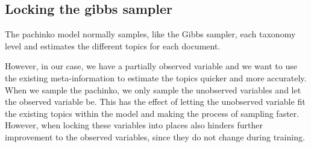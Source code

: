 \subsection{Locking the gibbs sampler}\label{sec:appendix/locking}
The pachinko model normally samples, like the Gibbs sampler, each taxonomy level and estimates the different topics for each document.

However, in our case, we have a partially observed variable and we want to use the existing meta-information to estimate the topics quicker and more accurately.
When we sample the pachinko, we only sample the unobserved variables and let the observed variable be. 
This has the effect of letting the unobserved variable fit the existing topics within the model and making the process of sampling faster.
However, when locking these variables into places also hinders further improvement to the observed variables, since they do not change during training.   
